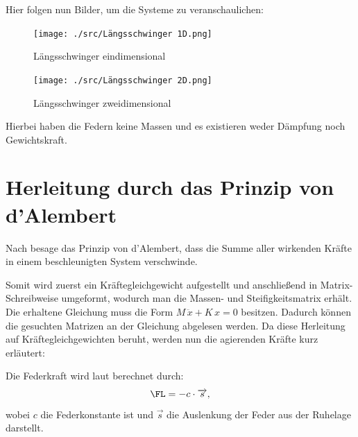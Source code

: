 \documentclass[a4paper,12pt]{report}
\theoremstyle{plain} %
\theoremstyle{definition} %
\theoremstyle{remark}
\begin{document}
      Hier folgen nun Bilder, um die Systeme zu veranschaulichen:

      \begin{figure}[ht]
            \centering
            \begin{minipage}[ht]{0.49\linewidth}
                  \centering
                  \texttt{[image: ./src/Längsschwinger 1D.png]}
                  \caption{Längsschwinger eindimensional}
                  \label{fig: Längsschwinger 1d}
            \end{minipage}
            \hfill
            \begin{minipage}[ht]{0.49\linewidth}
                  \centering
                  \texttt{[image: ./src/Längsschwinger 2D.png]}
                  \caption{Längsschwinger zweidimensional}
                  \label{fig: Längsschwinger 2d}
            \end{minipage}
      \end{figure}

      Hierbei haben die Federn keine Massen und es existieren weder Dämpfung noch Gewichtskraft.

      \section{Herleitung durch das Prinzip von d'Alembert}
            Nach \cite{d_AlembertPrinzip} besage das Prinzip von d'Alembert, dass die Summe aller wirkenden Kräfte in einem beschleunigten System verschwinde.

            Somit wird zuerst ein Kräftegleichgewicht aufgestellt und anschließend in Matrix-Schreibweise umgeformt, wodurch man die Massen- und Steifigkeitsmatrix erhält.
            Die erhaltene Gleichung muss die Form $M\,\ddot x+K\,x = 0$ besitzen. Dadurch können die gesuchten Matrizen an der Gleichung abgelesen werden.
            Da diese Herleitung auf Kräftegleichgewichten beruht, werden nun die agierenden Kräfte kurz erläutert:

            Die Federkraft \FL wird laut \cite{federkraft} berechnet durch:
            \begin{equation}
                  \label{eqn: Federkraft}
                  \FL = -c\cdot \overrightarrow s,
            \end{equation}
            wobei $c$ die Federkonstante ist und $\overrightarrow s$ die Auslenkung der Feder aus der Ruhelage darstellt.
\end{document}
